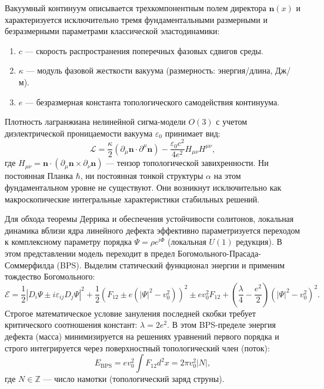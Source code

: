 \documentclass[11pt,a4paper]{article}
\begin{document}
	Вакуумный континуум описывается трехкомпонентным полем директора $\mathbf{n}(x)$ и характеризуется исключительно тремя фундаментальными размерными и безразмерными параметрами классической эластодинамики:
	\begin{enumerate}
		\item $c$ — скорость распространения поперечных фазовых сдвигов среды.
		\item $\kappa$ — модуль фазовой жесткости вакуума (размерность: энергия/длина, Дж/м).
		\item $e$ — безразмерная константа топологического самодействия континуума.
	\end{enumerate}
	Плотность лагранжиана нелинейной сигма-модели $O(3)$ с учетом диэлектрической проницаемости вакуума $\varepsilon_0$ принимает вид:
	\begin{equation}
		\mathcal{L} = \frac{\kappa}{2} (\partial_\mu \mathbf{n} \cdot \partial^\mu \mathbf{n}) - \frac{\varepsilon_0 c^2}{4 e^2} H_{\mu\nu} H^{\mu\nu},
		\label{eq:lagrangian}
	\end{equation}
	где $H_{\mu\nu} = \mathbf{n} \cdot (\partial_\mu \mathbf{n} \times \partial_\nu \mathbf{n})$ — тензор топологической завихренности. Ни постоянная Планка $\hbar$, ни постоянная тонкой структуры $\alpha$ на этом фундаментальном уровне не существуют. Они возникнут исключительно как макроскопические интегральные характеристики стабильных решений.
	
	Для обхода теоремы Деррика и обеспечения устойчивости солитонов, локальная динамика вблизи ядра линейного дефекта эффективно параметризуется переходом к комплексному параметру порядка $\Psi = \rho e^{i\Phi}$ (локальная $U(1)$ редукция). В этом представлении модель переходит в предел Богомольного-Прасада-Соммерфилда (BPS). Выделим статический функционал энергии и применим тождество Богомольного:
	\begin{equation}
		\mathcal{E} = \frac{1}{2} |D_i \Psi \pm i \varepsilon_{ij} D_j \Psi|^2 + \frac{1}{2} \left(F_{12} \pm e(|\Psi|^2 - v_0^2)\right)^2 \pm e v_0^2 F_{12} + \left(\frac{\lambda}{4} - \frac{e^2}{2}\right) (|\Psi|^2 - v_0^2)^2.
	\end{equation}
	Строгое математическое условие зануления последней скобки требует критического соотношения констант: $\lambda = 2e^2$. В этом BPS-пределе энергия дефекта (масса) минимизируется на решениях уравнений первого порядка и строго интегрируется через поверхностный топологический член (поток):
	\begin{equation}
		E_{\text{BPS}} = e v_0^2 \int F_{12} d^2x = 2\pi v_0^2 |N|,
	\end{equation}
	где $N \in \mathbb{Z}$ — число намотки (топологический заряд струны).
	
\end{document}
